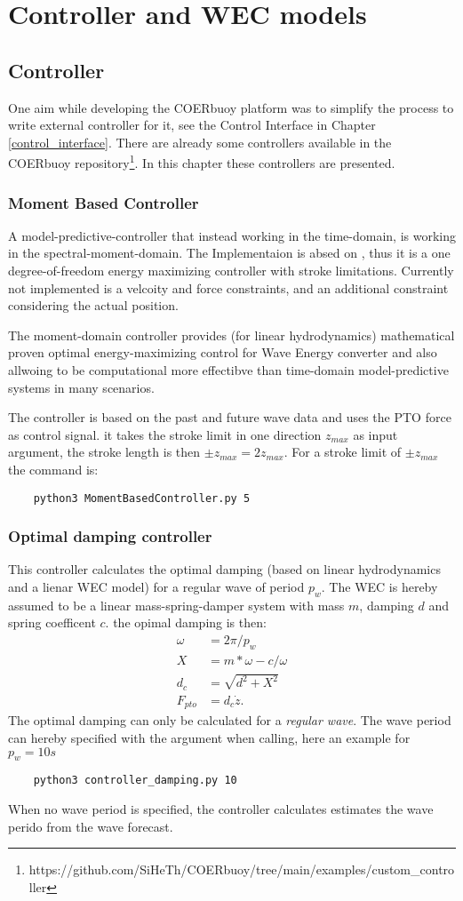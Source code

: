 \documentclass[oneside,10pt,a4paper]{book}
\begin{document}
\chapter{Controller and WEC models}
\section{Controller}
One aim while developing the COERbuoy platform was to simplify the process to write external controller for it, see the Control Interface in Chapter \ref{control_interface}. There are already some controllers available in the COERbuoy repository\footnote{https://github.com/SiHeTh/COERbuoy/tree/main/examples/custom\_controller}. In this chapter these controllers are presented.
\subsection{Moment Based Controller}
A model-predictive-controller that instead working in the time-domain, is working in the spectral-moment-domain. The Implementaion is absed on \cite{control_mbc_horizon}, thus it is a one degree-of-freedom energy maximizing controller with stroke limitations. Currently not implemented is a velcoity and force constraints, and an additional constraint considering the actual position.

The moment-domain controller provides (for linear hydrodynamics) mathematical proven optimal energy-maximizing control for Wave Energy converter and also allwoing to be computational more effectibve than time-domain model-predictive systems in many scenarios.

The controller is based on the past and future wave data and uses the PTO force as control signal. it takes the stroke limit in one direction $z_{max}$ as input argument, the stroke length is then $\pm z_{max}=2z_{max}$. For a stroke limit of $\pm z_{max}$ the command is:
\begin{verbatim}
	python3 MomentBasedController.py 5
\end{verbatim}
\subsection{Optimal damping controller}
This controller calculates the optimal damping (based on linear hydrodynamics and a lienar WEC model) for a regular wave of period $p_w$. The WEC is hereby assumed to be a linear mass-spring-damper system with mass $m$, damping $d$ and spring coefficent $c$. the opimal damping is then:
\begin{align*}
	\omega&=2\pi/p_w\\
	X&=m*\omega-c/\omega\\
	d_c&=\sqrt{d^2+X^2}\\
	F_{pto}&=d_c\dot{z}\text{.}
\end{align*}
The optimal damping can only be calculated for a \textit{regular wave}. The wave period can hereby specified with the argument when calling, here an example for $p_w=10 s$
\begin{verbatim}
	python3 controller_damping.py 10
\end{verbatim}
When no wave period is specified, the controller calculates estimates the wave perido from the wave forecast.
\end{document}
